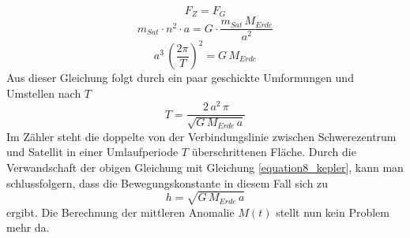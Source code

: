 \begin{equation}
	F_{Z}=F_{G}
\end{equation}     
\begin{equation}
	m_{Sat}\cdot n^2 \cdot a= G \cdot \frac{m_{Sat}\,M_{Erde}}{a^2}
\end{equation} 
\begin{equation}
	 a^3\,\left(\frac{2\pi}{T}\right)^2= G\,M_{Erde}
\end{equation}     
Aus dieser Gleichung folgt durch ein paar geschickte Umformungen und Umstellen nach \ensuremath{T}
\begin{equation}
	T=\frac{2\,a^2\,\pi}{\sqrt{G\,M_{Erde}\,a}}
\end{equation}
Im Zähler steht die doppelte von der Verbindungslinie zwischen Schwerezentrum und Satellit in einer Umlaufperiode \ensuremath{T} überschrittenen Fläche. Durch die Verwandschaft der obigen Gleichung mit Gleichung \ref{equation8_kepler}, kann man schlussfolgern, dass die Bewegungskonstante in diesem Fall sich zu 
\begin{equation}
	h=\sqrt{G\,M_{Erde}\,a}
\end{equation}   
ergibt. Die Berechnung der mittleren Anomalie \ensuremath{M(t)} stellt nun kein Problem mehr da.
